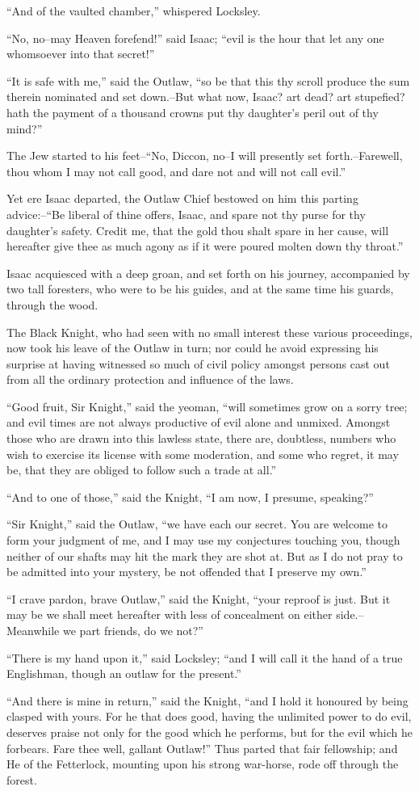``And of the vaulted chamber,'' whispered Locksley.

``No, no--may Heaven forefend!'' said Isaac; ``evil is the hour that let
any one whomsoever into that secret!''

``It is safe with me,'' said the Outlaw, ``so be that this thy scroll
produce the sum therein nominated and set down.--But what now, Isaac?
art dead? art stupefied? hath the payment of a thousand crowns put thy
daughter's peril out of thy mind?''

The Jew started to his feet--``No, Diccon, no--I will presently set
forth.--Farewell, thou whom I may not call good, and dare not and will
not call evil.''

Yet ere Isaac departed, the Outlaw Chief bestowed on him this parting
advice:--``Be liberal of thine offers, Isaac, and spare not thy purse
for thy daughter's safety. Credit me, that the gold thou shalt spare in
her cause, will hereafter give thee as much agony as if it were poured
molten down thy throat.''

Isaac acquiesced with a deep groan, and set forth on his journey,
accompanied by two tall foresters, who were to be his guides, and at the
same time his guards, through the wood.

The Black Knight, who had seen with no small interest these various
proceedings, now took his leave of the Outlaw in turn; nor could he
avoid expressing his surprise at having witnessed so much of civil
policy amongst persons cast out from all the ordinary protection and
influence of the laws.

``Good fruit, Sir Knight,'' said the yeoman, ``will sometimes grow on a
sorry tree; and evil times are not always productive of evil alone and
unmixed. Amongst those who are drawn into this lawless state, there are,
doubtless, numbers who wish to exercise its license with some
moderation, and some who regret, it may be, that they are obliged to
follow such a trade at all.''

``And to one of those,'' said the Knight, ``I am now, I presume,
speaking?''

``Sir Knight,'' said the Outlaw, ``we have each our secret. You are
welcome to form your judgment of me, and I may use my conjectures
touching you, though neither of our shafts may hit the mark they are
shot at. But as I do not pray to be admitted into your mystery, be not
offended that I preserve my own.''

``I crave pardon, brave Outlaw,'' said the Knight, ``your reproof is
just. But it may be we shall meet hereafter with less of concealment on
either side.--Meanwhile we part friends, do we not?''

``There is my hand upon it,'' said Locksley; ``and I will call it the
hand of a true Englishman, though an outlaw for the present.''

``And there is mine in return,'' said the Knight, ``and I hold it
honoured by being clasped with yours. For he that does good, having the
unlimited power to do evil, deserves praise not only for the good which
he performs, but for the evil which he forbears. Fare thee well, gallant
Outlaw!'' Thus parted that fair fellowship; and He of the Fetterlock,
mounting upon his strong war-horse, rode off through the forest.
